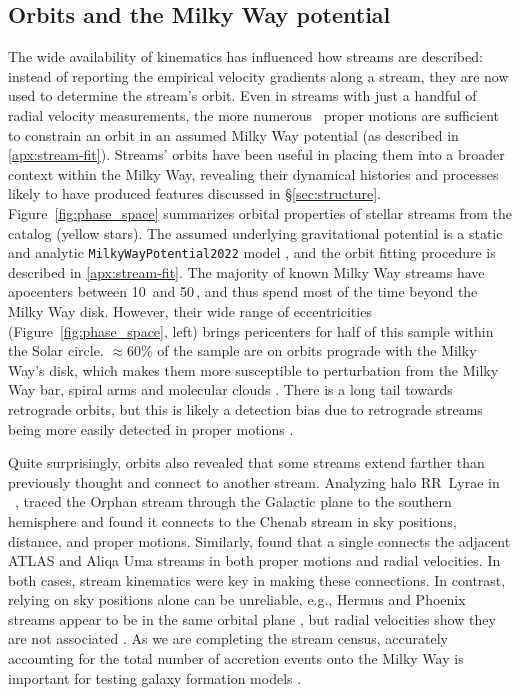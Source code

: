\documentclass[final,5p,times,twocolumn,authoryear]{elsarticle}
\begin{document}
\subsection{Orbits and the Milky Way potential}
\label{sec:mwpotential}
The wide availability of kinematics has influenced how streams are described: instead of reporting the empirical velocity gradients along a stream, they are now used to determine the stream's orbit.
Even in streams with just a handful of radial velocity measurements, the more numerous \gaia\ proper motions are sufficient to constrain an orbit in an assumed Milky Way potential (as described in \ref{apx:stream-fit}).
Streams' orbits have been useful in placing them into a broader context within the Milky Way, revealing their dynamical histories and processes likely to have produced features discussed in \S\ref{sec:structure}.
Figure~\ref{fig:phase_space} summarizes orbital properties of stellar streams from the \citet{ibata:2023} catalog (yellow stars).
The assumed underlying gravitational potential is a static and analytic \texttt{MilkyWayPotential2022} model \citep{price-whelan:2017}, and the orbit fitting procedure is described in \ref{apx:stream-fit}.
The majority of known Milky Way streams have apocenters between 10\,\unit{\kpc} and 50\,\unit{\kpc}, and thus spend most of the time beyond the Milky Way disk.
However, their wide range of eccentricities (Figure~\ref{fig:phase_space}, left) brings pericenters for half of this sample within the Solar circle.
$\approx60\%$ of the sample are on orbits prograde with the Milky Way's disk, which makes them more susceptible to perturbation from the Milky Way bar, spiral arms and molecular clouds \citep[e.g.,][]{amorisco:2016, erkal:2017, pearson:2017, banik:2019}.
There is a long tail towards retrograde orbits, but this is likely a detection bias due to retrograde streams being more easily detected in proper motions \citep[e.g.,][]{ibata:2021}.

Quite surprisingly, orbits also revealed that some streams extend farther than previously thought and connect to another stream.
Analyzing halo RR~Lyrae in \gaia~, \citet{koposov:2019} traced the Orphan stream through the Galactic plane to the southern hemisphere and found it connects to the Chenab stream in sky positions, distance, and proper motions.
Similarly, \citet{li:2021} found that a single  connects the adjacent ATLAS and Aliqa Uma streams in both proper motions and radial velocities.
In both cases, stream kinematics were key in making these connections.
In contrast, relying on sky positions alone can be unreliable, e.g., Hermus and Phoenix streams appear to be in the same orbital plane \citep{grillmair:2016b}, but radial velocities show they are not associated \citep{martin:2018}.
As we are completing the stream census, accurately accounting for the total number of accretion events onto the Milky Way is important for testing galaxy formation models \citep{pillepich:2015, shipp:2023, wright:2023, khoperskov:2023}.
\end{document}
